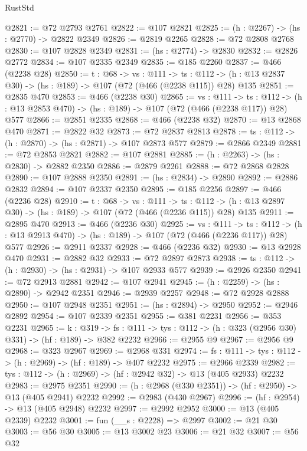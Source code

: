 \begin{lexlean}{RustStd}
\begin{coremodule}
@2821 := @72 @2793 @2761
@2822 := @107 @2821
@2825 := (h : @2267) -> (hs : @2770) -> @2822 @2349
@2826 := @2819 @2265
@2828 := @72 @2808 @2768
@2830 := @107 @2828 @2349
@2831 := (hs : @2774) -> @2830
@2832 := @2826 @2772
@2834 := @107 @2335 @2349
@2835 := @185 @2260
@2837 := @466 (@2238 @28)
@2850 := {t : @68} ->
  {vs : @111} ->
  {ts : @112} -> (h : @13 @2837 @30) -> (hs : @189) -> @107 (@72 (@466 (@2238 @115)) @28) @135
@2851 := @2835 @470
@2853 := @466 (@2238 @30)
@2865 := {vs : @111} ->
  {ts : @112} -> (h : @13 @2853 @470) -> (hs : @189) -> @107 (@72 (@466 (@2238 @117)) @28) @577
@2866 := @2851 @2335
@2868 := @466 (@2238 @32)
@2870 := @13 @2868 @470
@2871 := @2822 @32
@2873 := @72 @2837 @2813
@2878 := {ts : @112} -> (h : @2870) -> (hs : @2871) -> @107 @2873 @577
@2879 := @2866 @2349
@2881 := @72 @2853 @2821
@2882 := @107 @2881
@2885 := (h : @2263) -> (hs : @2830) -> @2882 @2350
@2886 := @2879 @2261
@2888 := @72 @2868 @2828
@2890 := @107 @2888 @2350
@2891 := (hs : @2834) -> @2890
@2892 := @2886 @2832
@2894 := @107 @2337 @2350
@2895 := @185 @2256
@2897 := @466 (@2236 @28)
@2910 := {t : @68} ->
  {vs : @111} ->
  {ts : @112} -> (h : @13 @2897 @30) -> (hs : @189) -> @107 (@72 (@466 (@2236 @115)) @28) @135
@2911 := @2895 @470
@2913 := @466 (@2236 @30)
@2925 := {vs : @111} ->
  {ts : @112} -> (h : @13 @2913 @470) -> (hs : @189) -> @107 (@72 (@466 (@2236 @117)) @28) @577
@2926 := @2911 @2337
@2928 := @466 (@2236 @32)
@2930 := @13 @2928 @470
@2931 := @2882 @32
@2933 := @72 @2897 @2873
@2938 := {ts : @112} -> (h : @2930) -> (hs : @2931) -> @107 @2933 @577
@2939 := @2926 @2350
@2941 := @72 @2913 @2881
@2942 := @107 @2941
@2945 := (h : @2259) -> (hs : @2890) -> @2942 @2351
@2946 := @2939 @2257
@2948 := @72 @2928 @2888
@2950 := @107 @2948 @2351
@2951 := (hs : @2894) -> @2950
@2952 := @2946 @2892
@2954 := @107 @2339 @2351
@2955 := @381 @2231
@2956 := @353 @2231
@2965 := {k : @319} ->
  {fs : @111} -> {tys : @112} -> (h : @323 (@2956 @30) @331) -> (hf : @189) -> @382 @2232
@2966 := @2955 @9
@2967 := @2956 @9
@2968 := @323 @2967
@2969 := @2968 @331
@2974 := {fs : @111} -> {tys : @112} -> (h : @2969) -> (hf : @189) -> @407 @2232
@2975 := @2966 @2339
@2982 := {tys : @112} -> (h : @2969) -> (hf : @2942 @32) -> @13 (@405 @2933) @2232
@2983 := @2975 @2351
@2990 := (h : @2968 (@330 @2351)) -> (hf : @2950) -> @13 (@405 @2941) @2232
@2992 := @2983 (@430 @2967)
@2996 := (hf : @2954) -> @13 (@405 @2948) @2232
@2997 := @2992 @2952
@3000 := @13 (@405 @2339) @2232
@3001 := fun (__s : @2228) => @2997
@3002 := @21 @30
@3003 := @56 @30
@3005 := @13 @3002 @23
@3006 := @21 @32
@3007 := @56 @32

\end{coremodule}
\end{lexlean}
